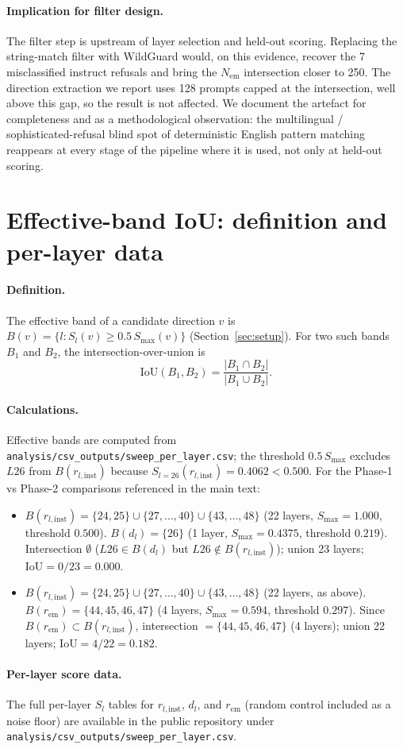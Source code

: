 \documentclass{article}
\newcommand{\rinst}{r_{l,\mathrm{inst}}}
\newcommand{\dinst}{d_{l}}
\newcommand{\rem}{r_{\mathrm{em}}}
\newcommand{\Sl}{S_{l}}
\begin{document}
\paragraph{Implication for filter design.} The filter step is
upstream of layer selection and held-out scoring. Replacing the
string-match filter with WildGuard would, on this evidence,
recover the 7 misclassified instruct refusals and bring the
$N_{\mathrm{em}}$ intersection closer to 250. The direction
extraction we report uses 128 prompts capped at the intersection,
well above this gap, so the result is not affected. We document
the artefact for completeness and as a methodological observation:
the multilingual / sophisticated-refusal blind spot of
deterministic English pattern matching reappears at every stage of
the pipeline where it is used, not only at held-out scoring.

\section{Effective-band IoU: definition and per-layer data}
\label{app:iou}

\paragraph{Definition.} The effective band of a candidate direction
$v$ is $B(v) = \{l : S_l(v) \geq 0.5\,S_{\max}(v)\}$
(Section~\ref{sec:setup}). For two such bands $B_1$ and $B_2$, the
intersection-over-union is
\[
  \mathrm{IoU}(B_1, B_2) = \frac{|B_1 \cap B_2|}{|B_1 \cup B_2|}.
\]

\paragraph{Calculations.} Effective bands are computed from
\texttt{analysis/csv\_outputs/sweep\_per\_layer.csv}; the threshold
$0.5\,S_{\max}$ excludes $L26$ from $B(\rinst)$ because
$S_{l=26}(\rinst)=0.4062<0.500$. For the Phase-1 vs Phase-2
comparisons referenced in the main text:

\begin{itemize}\itemsep1pt
\item $B(\rinst) = \{24, 25\} \cup \{27,\ldots,40\} \cup \{43,\ldots,48\}$
(22 layers, $S_{\max}=1.000$, threshold $0.500$). $B(\dinst) = \{26\}$
(1 layer, $S_{\max}=0.4375$, threshold $0.219$). Intersection
$\emptyset$ ($L26 \in B(\dinst)$ but $L26 \notin B(\rinst)$); union
23 layers; $\mathrm{IoU} = 0/23 = 0.000$.
\item $B(\rinst) = \{24, 25\} \cup \{27,\ldots,40\} \cup \{43,\ldots,48\}$
(22 layers, as above). $B(\rem) = \{44, 45, 46, 47\}$ (4 layers,
$S_{\max}=0.594$, threshold $0.297$). Since $B(\rem) \subset
B(\rinst)$, intersection $= \{44, 45, 46, 47\}$ (4 layers); union
22 layers; $\mathrm{IoU} = 4/22 = 0.182$.
\end{itemize}

\paragraph{Per-layer score data.} The full per-layer $\Sl$ tables
for $\rinst$, $\dinst$, and $\rem$ (random control included as a
noise floor) are available in the public repository under
\texttt{analysis/csv\_outputs/sweep\_per\_layer.csv}.
\end{document}
